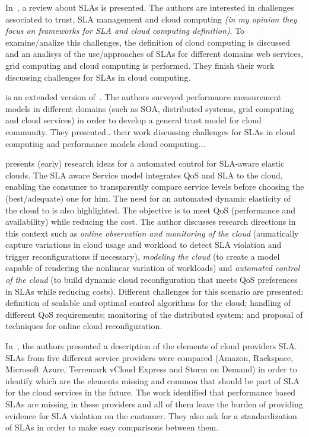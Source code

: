 \documentclass[12pt,a4paper,oneside]{book}
\begin{document}
\bigskip
In~\cite{003}, a review about SLAs is presented. The authors are interested in challenges associated to trust, SLA management and cloud computing \textit{(in my opinion they focus on frameworks for SLA and cloud computing definition)}. To examine/analize this challenges, the definition of cloud computing is discussed and an analisys of the use/approaches of SLAs for different domains web services, grid computing and cloud computing is performed. They finish their work discussing challenges for SLAs in cloud computing.

\bigskip
\cite{004} is an extended version of~\cite{003}. The authors surveyed performance measurement models in different domains (such as SOA, distributed systems, grid computing and cloud services) in order to develop a general trust model for cloud community. They presented.. their work discussing challenges for SLAs in cloud computing and performance models cloud computing...

\bigskip
\cite{013} presents (early) research ideas for a automated control for SLA-aware elastic clouds. The SLA aware Service model integrates QoS and SLA to the cloud, enabling the consumer to transparently compare service levels before choosing the (best/adequate) one for him. The need for an automated dynamic elasticity of the cloud to is also highlighted. The objective is to meet QoS (performance and availability) while reducing the cost. The author discusses research directions in this context such as \textit{online observation and monitoring of the cloud} (aumatically capture variations in cloud usage and workload to detect SLA violation and trigger reconfigurations if necessary), \textit{modeling the cloud} (to create a model capable of rendering the nonlinear variation of workloads) and \textit{automated control of the cloud} (to build dynamic cloud reconfiguration that meets QoS preferences in SLAs while reducing costs). Different challenges for this scenario are presented: definition of scalable and optimal control algorithms for the cloud; handling of different QoS requirements; monitoring of the distributed system; and proposal of techniques for online cloud reconfiguration.

\bigskip
In~\cite{010}, the authors presented a description of the elements of cloud providers SLA. SLAs from five different service providers were compared (Amazon, Rackspace, Microsoft Azure, Terremark vCloud Express and Storm on Demand) in order to identify which are the elements missing and common that should be part of SLA for the cloud services in the future. The work identified that performance based SLAs are missing in these providers and all of them leave the burden of providing evidence for SLA violation on the customer. They also ask for a standardization of SLAs in order to make easy comparisons between them.
\end{document}
